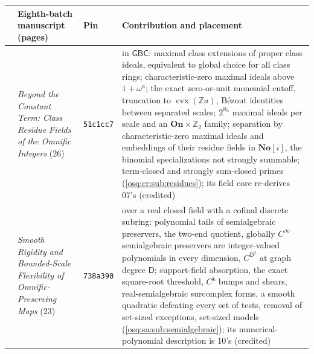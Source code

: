 \documentclass[11pt,letterpaper]{article}
\numberwithin{equation}{section}
\theoremstyle{definition}
\theoremstyle{remark}
\theoremstyle{plain}
\newcommand{\No}{\mathbf{No}}
\newcommand{\On}{\mathbf{On}}
\newcommand{\SC}{\No[i]}
\newcommand{\Z}{\mathbb Z}
\begin{document}
\begin{center}\small
\begin{tabular}{@{}>{\raggedright\arraybackslash}p{}>{\raggedright\arraybackslash}p{}>{\raggedright\arraybackslash}p{}>{\raggedright\arraybackslash}p{}@{}}
\toprule
& Eighth-batch manuscript (pages) & Pin & Contribution and placement\\
\midrule
24 & \emph{Beyond the Constant Term: Class Residue Fields of the Omnific Integers} (26) & \texttt{51c1cc7} & in $\mathsf{GBC}$: maximal class extensions of proper class ideals, equivalent to global choice for all class rings; characteristic-zero maximal ideals above $1+\omega^a$; the exact zero-or-unit monomial cutoff, truncation to $\operatorname{cvx}(\Z a)$, B\'ezout identities between separated scales; $2^{\aleph_0}$ maximal ideals per scale and an $\On\times\Z_2$ family; separation by characteristic-zero maximal ideals and embeddings of their residue fields in $\SC$, the binomial specializations not strongly summable; term-closed and strongly sum-closed primes (\cref{osq:cr:sub:residues}); its field core re-derives 07's (credited)\\
25 & \emph{Smooth Rigidity and Bounded-Scale Flexibility of Omnific-Preserving Maps} (23) & \texttt{738a390} & over a real closed field with a cofinal discrete subring: polynomial tails of semialgebraic preservers, the two-end quotient, globally $C^\infty$ semialgebraic preservers are integer-valued polynomials in every dimension, $C^{\mathsf D^2}$ at graph degree $\mathsf D$; support-field absorption, the exact square-root threshold, $C^{\mathsf k}$ bumps and shears, real-semialgebraic surcomplex forms, a smooth quadratic defeating every set of tests, removal of set-sized exceptions, set-sized models (\cref{osq:sa:sub:semialgebraic}); its numerical-polynomial description is 10's (credited)\\
\bottomrule
\end{tabular}
\end{center}
\end{document}
